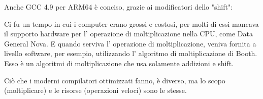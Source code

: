 









Anche GCC 4.9 per ARM64 è conciso, grazie ai modificatori dello "shift":




Ci fu un tempo in cui i computer erano grossi e costosi, per molti di essi mancava il supporto hardware per l' operazione di moltiplicazione
nella \ac{CPU}, come Data General Nova.
E quando serviva l' operazione di moltiplicazione, veniva fornita a livello software, per esempio, utilizzando l' algoritmo di moltiplicazione di Booth.
Esso è un algoritmi di moltiplicazione che usa solamente addizioni e shift.

Ciò che i moderni compilatori ottimizzati fanno, è diverso,
ma lo scopo (moltiplicare) e le risorse (operazioni veloci) sono le stesse.
